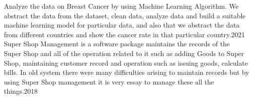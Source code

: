 \documentclass[
	a4paper,
]{fortysecondscv}
\begin{document}
\begin{cvtable}

    
		{Analyze the data on Breast Cancer by using Machine Learning Algorithm. We abstract the data from the dataset, clean data, analyze data and build a suitable machine learning model for particular data, and also that we abstract the data from different countries and show the cancer rate in that particular country.}{2021}\\
		
	
	{Super Shop Management is a software package maintains the records of the Super Shop and all of the operation related to it such as adding Goods to Super Shop, maintaining customer record and operation such as issuing goods, calculate bills. In old system there were many difficulties arising to maintain records but by using Super Shop management it is very essay to manage these all the things.}{2018}
\end{cvtable}
\end{document}
